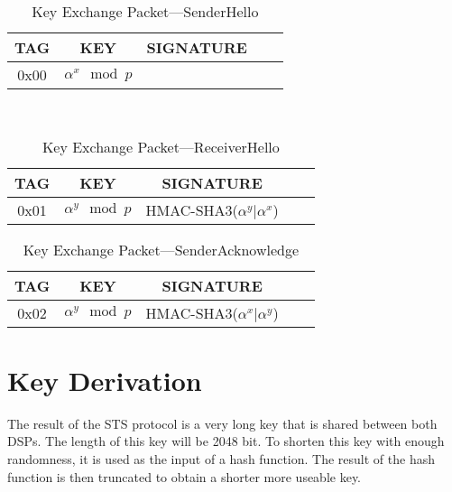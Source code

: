 \documentclass[a4paper]{article}
\begin{document}
\begin{table}[H]
    \begin{center}
        \begin{tabular}{| c | c | c | c | c |}
            \hline
            TAG & KEY & SIGNATURE \\ \hline
            0x00 & $\alpha^x\mod{p}$ & \\
            \hline
        \end{tabular}
    \end{center}
    \
    \caption{Key Exchange Packet---SenderHello}
    \label{tab:key_exchange_packet_senderhello}
\end{table}
\begin{table}[H]
    \begin{center}
        \begin{tabular}{| c | c | c | c | c |}
            \hline
            TAG & KEY & SIGNATURE \\ \hline
            0x01 & $\alpha^y\mod{p}$ & HMAC-SHA3($\alpha^y \big| \alpha^x$)\\
            \hline
        \end{tabular}
    \end{center}
    
    \caption{Key Exchange Packet---ReceiverHello}
    \label{tab:key_exchange_packet_receiverhello}
\end{table}
\begin{table}[H]
    \begin{center}
        \begin{tabular}{| c | c | c | c | c |}
            \hline
            TAG & KEY & SIGNATURE \\ \hline
            0x02 & $\alpha^y\mod{p}$ & HMAC-SHA3($\alpha^x \big| \alpha^y$)\\
            \hline
        \end{tabular}
    \end{center}
    
    \caption{Key Exchange Packet---SenderAcknowledge}
    \label{tab:key_exchange_packet_senderacknowledge}
\end{table}

\section{Key Derivation}

The result of the STS protocol is a very long key that is shared between both DSPs. The length of this key will be 2048 bit. To shorten this key with enough randomness, it is used as the input of a hash function. The result of the hash function is then truncated to obtain a shorter more useable key.\\
\end{document}
